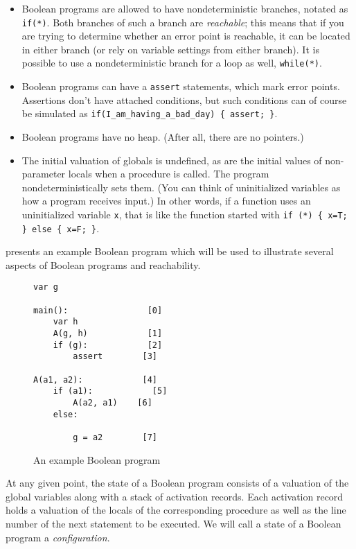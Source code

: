 \documentclass{article}
\newcommand{\Code}[1]{\texttt{#1}}
\begin{document}
\begin{itemize}
  \item 
    Boolean programs are allowed to have nondeterministic branches,
    notated as \Code{if(*)}. Both branches of such a branch are
    \emph{reachable}; this means that if you are trying to determine
    whether an error point is reachable, it can be located in either
    branch (or rely on variable settings from either branch). It is
    possible to use a nondeterministic branch for a loop as well,
    \Code{while(*)}.

  \item
    Boolean programs can have a \Code{assert} statements, which mark
    error points. Assertions don't have attached conditions, but such
    conditions can of course be simulated as
    \Code{if(I\_am\_having\_a\_bad\_day) \{ assert; \}}.


  \item
    Boolean programs have no heap. (After all, there are no pointers.)

  \item
    The initial valuation of globals is undefined, as are the initial
    values of non-parameter locals when a procedure is called. The
    program nondeterministically sets them. (You can think of
    uninitialized variables as how a program receives input.) In other
    words, if a function uses an uninitialized variable \Code{x}, that
    is like the function started with \Code{if (*) \{ x=T; \} else \{
      x=F; \}}.
\end{itemize}

 presents an example Boolean program
which will be used to illustrate several aspects of Boolean programs
and reachability.

\begin{figure}
\begin{verbatim}
var g

main():                [0]
    var h
    A(g, h)            [1]
    if (g):            [2]
        assert        [3]

A(a1, a2):            [4]
    if (a1):            [5]
        A(a2, a1)    [6]
    else:       

        g = a2        [7]
\end{verbatim}
\caption{An example Boolean program}
\label{fi:boolean-example-program}
\end{figure}


At any given point, the state of a Boolean program consists of a
valuation of the global variables along with a stack of activation
records. Each activation record holds a valuation of the locals of the
corresponding procedure as well as the line number of the next
statement to be executed. We will call a state of a Boolean program a
\emph{configuration}.
\end{document}

